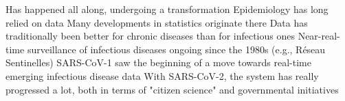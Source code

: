 \documentclass[aspectratio=169]{beamer}\usepackage[]{graphicx}\usepackage[]{xcolor}
\begin{document}
\begin{frame}{Has happened all along, undergoing a transformation}
\bbullet Epidemiology has long relied on data
\vfill
\bbullet Many developments in statistics originate there
\vfill
\bbullet Data has traditionally been better for chronic diseases than for infectious ones
\vfill
\bbullet Near-real-time surveillance of infectious diseases ongoing since the 1980s (e.g., Réseau Sentinelles)
\vfill
\bbullet SARS-CoV-1 saw the beginning of a move towards real-time emerging infectious disease data
\vfill
\bbullet With SARS-CoV-2, the system has really progressed a lot, both in terms of "citizen science" and governmental initiatives
\end{frame}
\end{document}
